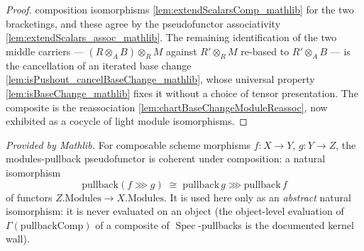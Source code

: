 \begin{lemma}
\begin{proof}
    composition isomorphisms \cref{lem:extendScalarsComp_mathlib} for the two bracketings, and these
    agree by the pseudofunctor associativity \cref{lem:extendScalars_assoc_mathlib}. The remaining
    identification of the two middle carriers — \((R\otimes_A B)\otimes_R M\) against
    \(R'\otimes_R M\) re-based to \(R'\otimes_A B\) — is the cancellation of an iterated base change
    \cref{lem:isPushout_cancelBaseChange_mathlib}, whose universal property
    \cref{lem:isBaseChange_mathlib} fixes it without a choice of tensor presentation. The composite
    is the reassociation \cref{lem:chartBaseChangeModuleReassoc}, now exhibited as a cocycle of light
    module isomorphisms.
  \end{proof}
\end{lemma}


\begin{lemma}
  \label{lem:pullbackComp_mathlib}
  \mathlibok
  \textit{Provided by Mathlib.}
  For composable scheme morphisms \(f : X \to Y\), \(g : Y \to Z\), the modules-pullback pseudofunctor
  is coherent under composition: a natural isomorphism
  \[
    \mathrm{pullback}(f \ggg g) \;\cong\; \mathrm{pullback}\,g \ggg \mathrm{pullback}\,f
  \]
  of functors \(Z.\mathrm{Modules} \to X.\mathrm{Modules}\). It is used here only as an \emph{abstract}
  natural isomorphism: it is never evaluated on an object (the object-level evaluation of
  \(\Gamma(\mathrm{pullbackComp})\) of a composite of \(\operatorname{Spec}\)-pullbacks is the
  documented kernel wall).
\end{lemma}

